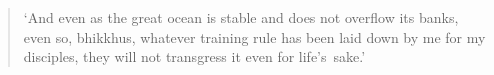 \clearpage
\thispagestyle{empty}

\mbox{}
\vfill

\begin{quote}
\ifreferenceedition
\normalsize
\fi

`And even as the great ocean
is stable and does not overflow its banks,
even so, bhikkhus, whatever training
rule has been laid down by me for my disciples,
they will not transgress it even for life's~sake.'

\end{quote}

\vfill
\mbox{}

